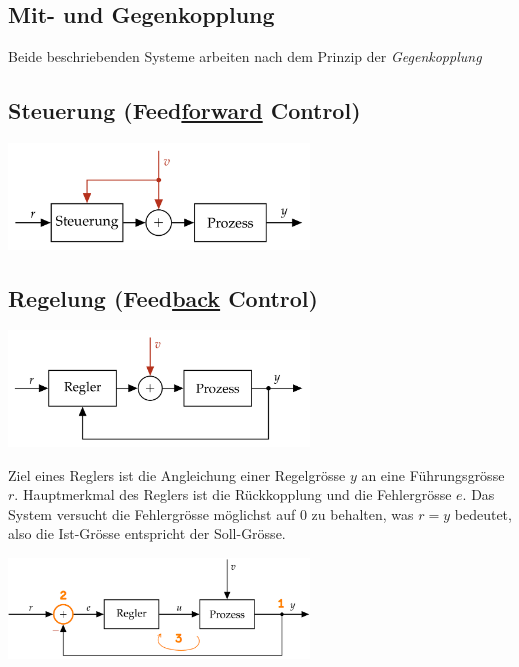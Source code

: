 \documentclass[
  10pt,
  a4paper,
  german]{article}
\numberwithin{equation}{section}
\begin{document}
\begin{multicols}{2}
\begin{tcolorbox}
\end{tcolorbox}

\hypertarget{mit--und-gegenkopplung}{%
\subsection{Mit- und Gegenkopplung}\label{mit--und-gegenkopplung}}

Beide beschriebenden Systeme arbeiten nach dem Prinzip der
\emph{Gegenkopplung}

\hypertarget{steuerung-feedforward-control}{%
\subsection{\texorpdfstring{Steuerung (Feed\uline{forward}
Control)}{Steuerung (Feedforward Control)}}\label{steuerung-feedforward-control}}

\includegraphics[width=8cm,height=\textheight]{images/steuerung.png}

\hypertarget{regelung-feedback-control}{%
\subsection{\texorpdfstring{Regelung (Feed\uline{back}
Control)}{Regelung (Feedback Control)}}\label{regelung-feedback-control}}

\includegraphics[width=8cm,height=\textheight]{images/regelung.png}

Ziel eines Reglers ist die Angleichung einer Regelgrösse \(y\) an eine
Führungsgrösse \(r\). Hauptmerkmal des Reglers ist die Rückkopplung und
die Fehlergrösse \(e\). Das System versucht die Fehlergrösse möglichst
auf \(0\) zu behalten, was \(r = y\) bedeutet, also die Ist-Grösse
entspricht der Soll-Grösse.

\includegraphics[width=8cm,height=\textheight]{images/definition_regelung.png}


\end{multicols}
\end{document}
